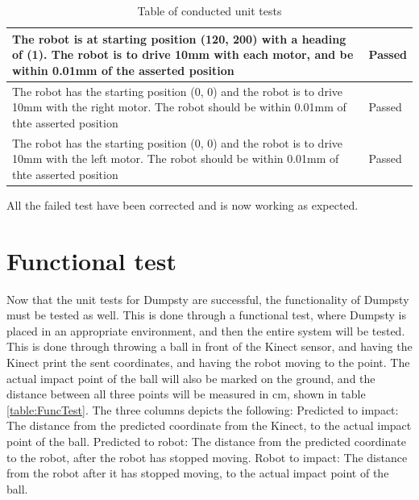 \begin{table}[H]
\begin{center}
\begin{tabular}{ | p{10cm} | p{5cm} |}
		The robot is at starting position (120, 200) with a heading of (1). The robot is to drive 10mm with each motor, and be within 0.01mm of the asserted position & Passed \\ \hline
		The robot has the starting position (0, 0) and the robot is to drive 10mm with the right motor. The robot should be within 0.01mm of thte asserted position & Passed \\ \hline
		The robot has the starting position (0, 0) and the robot is to drive 10mm with the left motor. The robot should be within 0.01mm of thte asserted position & Passed \\ \hline
	\end{tabular}
	\caption{Table of conducted unit tests}
	\label{table:Unit tests}
\end{center}
\end{table}

All the failed test have been corrected and is now working as expected. 

\section{Functional test}
\label{sec:LasseSucks}
Now that the unit tests for Dumpsty are successful, the functionality of Dumpsty must be tested as well. This is done through a functional test, where Dumpsty is placed in an appropriate environment, and then the entire system will be tested. This is done through throwing a ball in front of the Kinect sensor, and having the Kinect print the sent coordinates, and having the robot moving to the point. The actual impact point of the ball will also be marked on the ground, and the distance between all three points will be measured in cm, shown in table \ref{table:FuncTest}. \newline
The three columns depicts the following:\newline
Predicted to impact: The distance from the predicted coordinate from the Kinect, to the actual impact point of the ball.\newline
Predicted to robot: The distance from the predicted coordinate to the robot, after the robot has stopped moving.\newline
Robot to impact: The distance from the robot after it has stopped moving, to the actual impact point of the ball.

